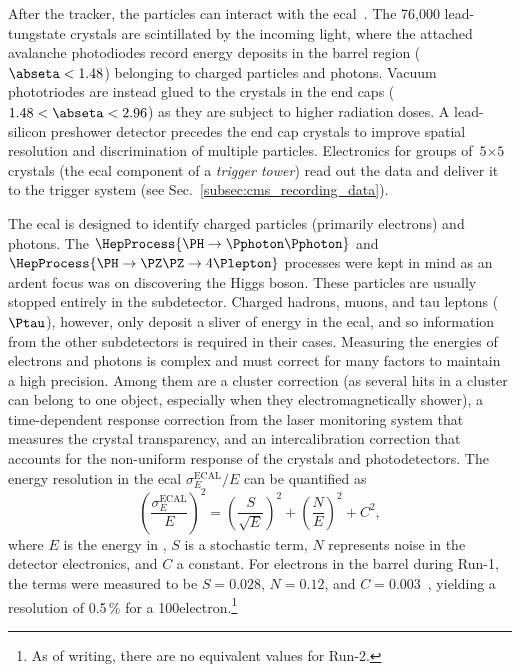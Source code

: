 After the tracker, the particles can interact with the \acrshort{ecal}~\cite{CERN-LHCC-97-033,Bloch:581342}. The 76,000 lead-tungstate crystals are scintillated by the incoming light, where the attached avalanche photodiodes record energy deposits in the barrel region ($\abseta < \text{1.48}$) belonging to charged particles and photons. Vacuum phototriodes are instead glued to the crystals in the end caps ($\text{1.48} < \abseta < \text{2.96}$) as they are subject to higher radiation doses. A lead-silicon preshower detector precedes the end cap crystals to improve spatial resolution and discrimination of multiple particles. Electronics for groups of $\text{5}\times\text{5}$ crystals (the \acrshort{ecal} component of a \emph{trigger tower}) read out the data and deliver it to the trigger system (see Sec.~\ref{subsec:cms_recording_data}).

The \acrshort{ecal} is designed to identify charged particles (primarily electrons) and photons. The $\HepProcess{\PH \to \Pphoton\Pphoton}$ and $\HepProcess{\PH \to \PZ\PZ \to 4\Plepton}$ processes were kept in mind as an ardent focus was on discovering the Higgs boson. These particles are usually stopped entirely in the subdetector. Charged hadrons, muons, and tau leptons ($\Ptau$), however, only deposit a sliver of energy in the \acrshort{ecal}, and so information from the other subdetectors is required in their cases. Measuring the energies of electrons and photons is complex and must correct for many factors to maintain a high precision. Among them are a cluster correction (as several hits in a cluster can belong to one object, especially when they electromagnetically shower), a time-dependent response correction from the laser monitoring system that measures the crystal transparency, and an intercalibration correction that accounts for the non-uniform response of the crystals and photodetectors. The energy resolution in the \acrshort{ecal} $\sigma_E^{\mathrm{ECAL}} / E$ can be quantified as
\begin{equation}
    \left( \frac{\sigma_E^{\mathrm{ECAL}}}{E} \right)^2 = \left( \frac{S}{\sqrt{E}} \right)^2 + \left( \frac{N}{E} \right)^2 + C^2,
    \label{eq:ecal_resolution}
\end{equation}
where $E$ is the energy in \GeVns, $S$ is a stochastic term, $N$ represents noise in the detector electronics, and $C$ a constant. For electrons in the barrel during Run-1, the terms were measured to be $S = \text{0.028}$, $N = \text{0.12}$, and $C = \text{0.003}$~\cite{Ingram_2007}, yielding a resolution of 0.5\,\% for a 100\GeV electron.\footnote{As of writing, there are no equivalent values for Run-2.}

